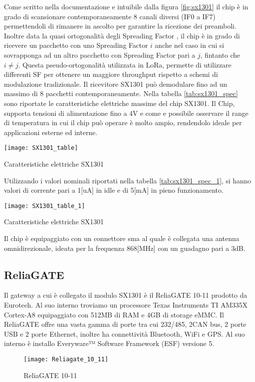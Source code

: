 Come scritto nella documentazione   e intuibile dalla
figura \ref{fig:sx1301} il chip è in grado di scansionare contemporaneamente 
8 canali diversi (IF0 a IF7)  permettendoli di rimanere in ascolto per garantire
la ricezione dei preamboli.
Inoltre data la quasi ortogonalità degli Spreading Factor
, il chip è in grado di ricevere un pacchetto
con uno Spreading Factor $i$ anche nel caso in cui si sovrapponga ad un altro
pacchetto con Spreading Factor pari a $j$, fintanto che $i\neq j$. Questa
pseudo-ortogonalità utilizzata in LoRa, permette di utilizzare differenti SF per
ottenere un maggiore throughput rispetto a schemi di modulazione tradizionale.
Il ricevitore  SX1301 può demodulare fino ad un massimo di 8 pacchetti
contemporaneamente.
Nella tabella \ref{tab:sx1301_spec} sono riportate le caratteristiche elettriche
massime del  chip SX1301. Il Chip, supporta tensioni di
alimentazione fino a 4V e  come e possibile osservare il range di temperatura in cui il
chip può operare è molto ampio, rendendolo ideale per applicazioni esterne ed
interne. 

\begin{table}[h]
        \centering 
                \texttt{[image: SX1301\_table]}
        \caption{Caratteristiche elettriche SX1301}
\label{tab:sx1301_spec}
\end{table}
Utilizzando i valori nominali riportati nella tabella \ref{tab:sx1301_spec_1},
si hanno valori di corrente pari a 1[uA] in idle  e di 5[mA] in pieno
funzionamento.
\begin{table}[h]
        \centering 
                \texttt{[image: SX1301\_table\_1]}
        \caption{Caratteristiche elettriche SX1301}
        \label{tab:sx1301_spec_1}
\end{table}
Il chip è equipaggiato con un connettore sma al quale è collegata una
antenna omnidirezionale, ideata per la frequenza 868[MHz] con un guadagno pari a 3dB.

\subsection{ReliaGATE}
Il gateway a cui è collegato il modulo SX1301 è il ReliaGATE 10-11 prodotto da
Eurotech. Al suo interno troviamo un processore Texas Instruments TI AM335X Cortex-A8 
equipaggiato con 512MB di RAM e 4GB di storage eMMC. Il ReliaGATE offre una
vasta gamma di porte tra cui 232/485, 2CAN bus, 2 porte USB e 2 porte Ethernet,
inoltre ha connettività Bluetooth, WiFi e GPS. Al suo interno è installo
Everyware™ Software Framework (ESF) versione 5.
\begin{figure}[h]
        \centering 
                \texttt{[image: Reliagate\_10\_11]}
        \caption{ReliaGATE 10-11}
        \label{fig:ReliaGATE}
\end{figure}




